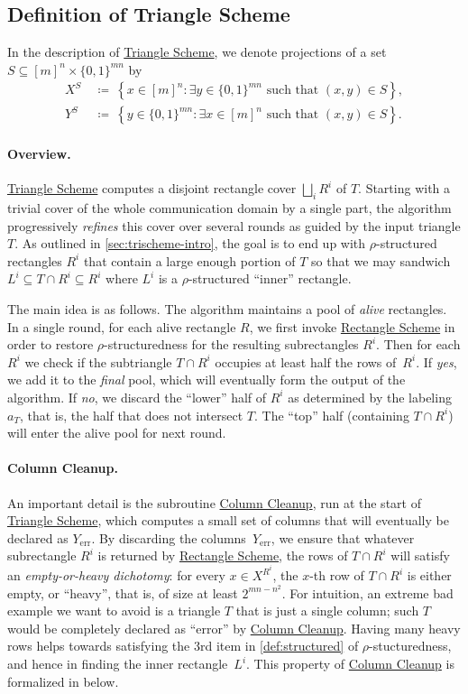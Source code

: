 \documentclass{toc}
\newcommand{\rectscheme}{\hyperref[alg:partition]{Rectangle Scheme}\xspace}
\newcommand{\trischeme}{\hyperref[alg:tri-partition]{Triangle Scheme}\xspace}
\newcommand{\columnclean}{\hyperref[alg:column-cleanup]{Column Cleanup}\xspace}
\DeclareMathOperator{\err}{err}
\newcommand{\allX}{[m]^n}
\newcommand{\allY}{\{0,1\}^{mn}}
\newcommand{\set}[1]{\left \{ #1 \right \}}
\begin{document}
\subsection{Definition of Triangle Scheme} \label{sec:proof-tri-partition}

In the description of \trischeme, we denote projections of a set $S \subseteq \allX \times \allY$ by
\begin{align*}
X^S~&\coloneqq~\set{x \in \allX : \exists y \in \allY \text{ such that } (x,y) \in S},\\
Y^S~&\coloneqq~\set{y \in \allY : \exists x \in \allX \text{ such that } (x,y) \in S}.
\end{align*}
\paragraph{Overview.}
\trischeme computes a disjoint rectangle cover $\bigsqcup_i R^i$ of $T$. 
Starting with a trivial cover of the whole communication domain by a single part, the algorithm progressively \emph{refines} this cover over several rounds as guided by the input triangle $T$. As outlined in \autoref{sec:trischeme-intro}, the goal is to end up with $\rho$-structured rectangles $R^i$ that contain a large enough portion of $T$ so that we may sandwich $L^i\subseteq T\cap R^i\subseteq R^i$ where $L^i$ is a $\rho$-structured ``inner'' rectangle.

The main idea is as follows. The algorithm maintains a pool of \emph{alive} rectangles. In a single round, for each alive rectangle $R$, we first invoke \rectscheme in order to restore $\rho$-structuredness for the resulting subrectangles $R^i$. Then for each $R^i$ we check if the subtriangle $T\cap R^i$ occupies at least half the rows of~$R^i$. If \emph{yes}, we add it to the \emph{final} pool, which will eventually form the output of the algorithm. If \emph{no}, we discard the ``lower'' half of $R^i$ as determined by the labeling $a_T$, that is, the half that does not intersect $T$. The ``top'' half (containing $T\cap R^i$) will enter the alive pool for next round.

\paragraph{Column Cleanup.}
An important detail is the subroutine \columnclean, run at the start of \trischeme, which computes a small set of columns that will eventually be declared as $Y_{\err}$. By discarding the columns~$Y_{\err}$, we ensure that whatever subrectangle $R^i$ is
returned %
by \rectscheme, the rows of $T\cap R^i$ will satisfy an \emph{empty-or-heavy dichotomy}: for every $x\in X^{R^i}$, the $x$-th row of $T\cap R^i$ is either empty, or ``heavy'', that is, of size at least $2^{mn-n^2}$. For intuition, an extreme bad example we want to avoid is a triangle $T$ that is just a single column; such $T$ would be completely declared as ``error'' by \columnclean. Having many heavy rows helps towards satisfying the 3rd item in \autoref{def:structured} of $\rho$-stucturedness, and hence in finding the inner rectangle~$L^i$. This property of \columnclean is formalized in  below.
\end{document}
